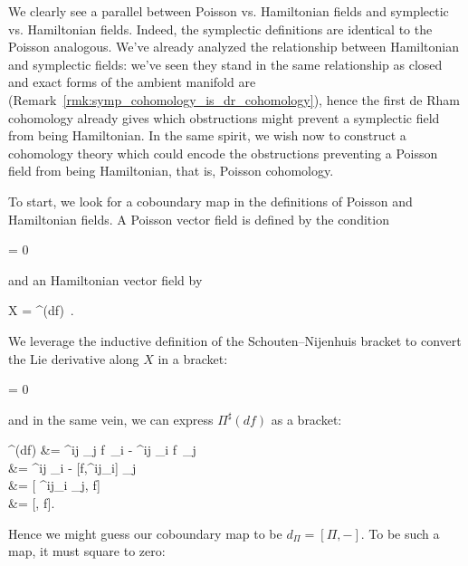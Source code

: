 \documentclass[main.tex]{subfiles}
\begin{document}

We clearly see a parallel between Poisson vs. Hamiltonian fields and symplectic vs. Hamiltonian fields. Indeed, the symplectic definitions are identical to the Poisson analogous. We've already analyzed the relationship between Hamiltonian and symplectic fields: we've seen they stand in the same relationship as closed and exact forms of the ambient manifold are (Remark~\ref{rmk:symp_cohomology_is_dr_cohomology}), hence the first de Rham cohomology already gives which obstructions might prevent a symplectic field from being Hamiltonian. In the same spirit, we wish now to construct a cohomology theory which could encode the obstructions preventing a Poisson field from being Hamiltonian, that is, Poisson cohomology.

To start, we look for a coboundary map in the definitions of Poisson and Hamiltonian fields. A Poisson vector field is defined by the condition
\begin{eqalign}
	\Pi = 0
\end{eqalign}
and an Hamiltonian vector field by
\begin{eqalign}
	X = \Pi^\sharp(df)\ .
\end{eqalign}
We leverage the inductive definition of the Schouten--Nijenhuis bracket to convert the Lie derivative along $X$ in a bracket:
\begin{eqalign}
	[\Pi, X] = 0
\end{eqalign}
and in the same vein, we can express $\Pi^\sharp(df)$ as a bracket:
\begin{eqalign}
	\Pi^\sharp(df) &=  \Pi^{ij} \partial_j f\, \partial_i -  \Pi^{ij} \partial_i f\, \partial_j\\
		&=  \Pi^{ij} \partial_i \wedge [f, \partial_j] -  [f,\Pi^{ij}\partial_i] \wedge \partial_j\\
		&= [ \Pi^{ij}\partial_i \wedge \partial_j, f]\\
		&= [\Pi, f].
\end{eqalign}
Hence we might guess our coboundary map to be $d_\Pi = [\Pi, -]$. To be such a map, it must square to zero:
\end{document}
